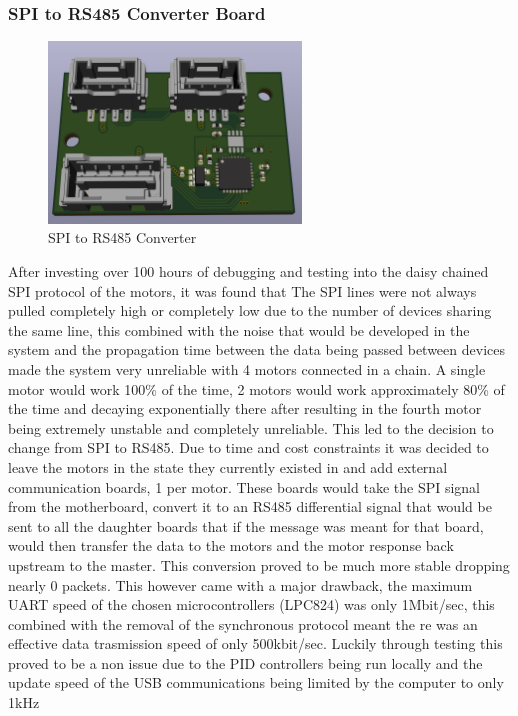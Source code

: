 \subsubsection{SPI to RS485 Converter Board}
\begin{figure}[H]
       \centering
       \includegraphics[width=0.6\textwidth]{figures/ConverterBoard.png}
       \caption{SPI to RS485 Converter}
       \label{fig:SPItoRS485ConverterPCB}
   \end{figure}
   After investing over 100 hours of debugging and testing into the daisy chained SPI protocol of the motors, it was found that The SPI lines were not always pulled completely high or completely low due to the number of devices sharing the same line, this combined with the noise that would be developed in the system and the propagation time between the data being passed between devices made the system very unreliable with 4 motors connected in a chain. A single motor would work 100\% of the time, 2 motors would work approximately 80\% of the time and decaying exponentially there after resulting in the fourth motor being extremely unstable and completely unreliable. This led to the decision to change from SPI to RS485. Due to time and cost constraints it was decided to leave the motors in the state they currently existed in and add external communication boards, 1 per motor. These boards would take the SPI signal from the motherboard, convert it to an RS485 differential signal that would be sent to all the daughter boards that if the message was meant for that board, would then transfer the data to the motors and the motor response back upstream to the master. This conversion proved to be much more stable dropping nearly 0 packets. This however came with a major drawback, the maximum UART speed of the chosen microcontrollers (LPC824) was only 1Mbit/sec, this combined with the removal of the synchronous protocol meant the re was an effective data trasmission speed of only 500kbit/sec. Luckily through testing this proved to be a non issue due to the PID controllers being run locally and the update speed of the USB communications being limited by the computer to only 1kHz 

